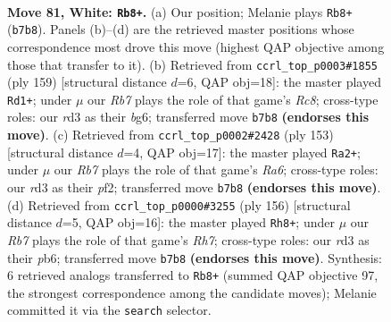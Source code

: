 \documentclass[11pt]{article}
\begin{document}
\clearpage

\begin{figure}[p]\centering
\begin{subfigure}{0.46\textwidth}\centering
\resizebox{\linewidth}{!}{%
\newchessgame
\chessboard[
  setfen={7k/1R6/8/6K1/r6P/3r4/8/8 w - - 3 81},
  showmover=false,
  pgfstyle=straightmove, color=movearrow, markmove={b7-b8}
]}
\caption{}
\end{subfigure}\hfill
\begin{subfigure}{0.46\textwidth}\centering
\resizebox{\linewidth}{!}{%
\newchessgame
\chessboard[
  setfen={6k1/R5p1/6B1/3K4/8/8/8/2r5 b - - 64 80},
  showmover=false,
  pgfstyle=straightmove, color=movearrow, markmove={c1-d1}
]}
\caption{}
\end{subfigure}
\\[4pt]
\begin{subfigure}{0.46\textwidth}\centering
\resizebox{\linewidth}{!}{%
\newchessgame
\chessboard[
  setfen={8/8/2p4R/3k4/8/r7/2K2P2/8 b - - 4 77},
  showmover=false,
  pgfstyle=straightmove, color=movearrow, markmove={a3-a2}
]}
\caption{}
\end{subfigure}\hfill
\begin{subfigure}{0.46\textwidth}\centering
\resizebox{\linewidth}{!}{%
\newchessgame
\chessboard[
  setfen={k7/7R/1p6/1P4r1/2K5/8/8/8 w - - 17 79},
  showmover=false,
  pgfstyle=straightmove, color=movearrow, markmove={h7-h8}
]}
\caption{}
\end{subfigure}
\caption{\textbf{Move 81, White: \texttt{Rb8+}.} (a) Our position; Melanie plays \texttt{Rb8+} (\texttt{b7b8}). Panels (b)--(d) are the retrieved master positions whose correspondence most drove this move (highest QAP objective among those that transfer to it). (b) Retrieved from \texttt{ccrl\_top\_p0003\#1855} (ply 159) [structural distance $d$=6, QAP obj=18]: the master played \texttt{Rd1+}; under $\mu$ our \emph{Rb7} plays the role of that game's \emph{Rc8}; cross-type roles: our \emph{r}d3 as their \emph{b}g6; transferred move \texttt{b7b8} \textbf{(endorses this move)}. (c) Retrieved from \texttt{ccrl\_top\_p0002\#2428} (ply 153) [structural distance $d$=4, QAP obj=17]: the master played \texttt{Ra2+}; under $\mu$ our \emph{Rb7} plays the role of that game's \emph{Ra6}; cross-type roles: our \emph{r}d3 as their \emph{p}f2; transferred move \texttt{b7b8} \textbf{(endorses this move)}. (d) Retrieved from \texttt{ccrl\_top\_p0000\#3255} (ply 156) [structural distance $d$=5, QAP obj=16]: the master played \texttt{Rh8+}; under $\mu$ our \emph{Rb7} plays the role of that game's \emph{Rh7}; cross-type roles: our \emph{r}d3 as their \emph{p}b6; transferred move \texttt{b7b8} \textbf{(endorses this move)}. Synthesis: 6 retrieved analogs transferred to \texttt{Rb8+} (summed QAP objective 97, the strongest correspondence among the candidate moves); Melanie committed it via the \texttt{search} selector.}
\label{fig:thought-m160}
\end{figure}
\end{document}

